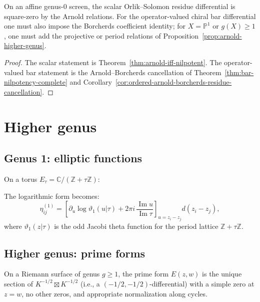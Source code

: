 \begin{corollary}
\label{cor:bar-d-squared-zero}
On an affine genus-$0$ screen, the scalar Orlik--Solomon residue
differential is square-zero by the Arnold relations. For the
operator-valued chiral bar differential one must also impose the
Borcherds coefficient identity; for $X=\mathbb{P}^1$ or
$g(X)\geq 1$, one must add the projective or period relations of
Proposition~\ref{prop:arnold-higher-genus}.
\end{corollary}
\begin{proof}
The scalar statement is Theorem~\ref{thm:arnold-iff-nilpotent}. The
operator-valued bar statement is the Arnold--Borcherds cancellation of
Theorem~\ref{thm:bar-nilpotency-complete} and
Corollary~\ref{cor:ordered-arnold-borcherds-residue-cancellation}.
\end{proof}

\section{Higher genus}

\subsection{Genus 1: elliptic functions}

On a torus $E_\tau = \mathbb{C}/(\mathbb{Z} + \tau\mathbb{Z})$:

\begin{theorem}
\label{thm:elliptic-logarithmic-forms}
The logarithmic form becomes:
\[
\eta_{ij}^{(1)}
=
\left[
\partial_u\log\vartheta_1(u|\tau)
+2\pi i\,\frac{\operatorname{Im}u}{\operatorname{Im}\tau}
\right]_{u=z_i-z_j}
d(z_i-z_j),
\]
where $\vartheta_1(z|\tau)$ is the odd Jacobi theta function for the
period lattice $\mathbb Z+\tau\mathbb Z$.
\end{theorem}

\subsection{Higher genus: prime forms}

\begin{definition}
On a Riemann surface of genus $g \geq 1$, the prime form $E(z,w)$ is the unique section of $K^{-1/2} \boxtimes K^{-1/2}$ (i.e., a $(-1/2, -1/2)$-differential) with a simple zero at $z = w$, no other zeros, and appropriate normalization along cycles.
\end{definition}

